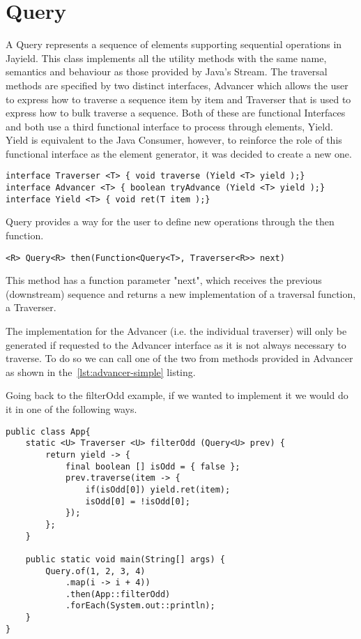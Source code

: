 \section{Query}

A Query represents a sequence of elements supporting sequential operations in Jayield. This class implements all the utility methods with the same name, semantics and behaviour as those provided by Java's Stream. The traversal methods are specified by two distinct interfaces, Advancer which allows the user to express how to traverse a sequence item by item and Traverser that is used to express how to bulk traverse a sequence. Both of these are functional Interfaces and both use a third functional interface to process through elements, Yield. Yield is equivalent to the Java Consumer, however, to reinforce the role of this functional interface as the element generator, it was decided to create a new one.
\begin{lstlisting}[caption={Interfaces},captionpos=b]
interface Traverser <T> { void traverse (Yield <T> yield );}
interface Advancer <T> { boolean tryAdvance (Yield <T> yield );}
interface Yield <T> { void ret(T item );}
\end{lstlisting}

Query provides a way for the user to define new operations through the then function.
\begin{lstlisting}[caption={Traversal function generator},captionpos=b]
<R> Query<R> then(Function<Query<T>, Traverser<R>> next)
\end{lstlisting}
This method has a function parameter "next", which receives the previous (downstream) sequence and returns a new implementation of a traversal function, a Traverser.


 The implementation for the Advancer (i.e. the individual traverser) will only be generated if requested to the Advancer interface as it is not always necessary to traverse. To do so we can call one of the two from methods provided in Advancer as shown in the~\ref{lst:advancer-simple} listing.

\newpage
Going back to the filterOdd example, if we wanted to implement it we would do it in one of the following ways.
\begin{lstlisting}[caption={filterOdd using Query and Traverser},captionpos=b]
public class App{
	static <U> Traverser <U> filterOdd (Query<U> prev) {
		return yield -> {
			final boolean [] isOdd = { false };
			prev.traverse(item -> {
				if(isOdd[0]) yield.ret(item);
				isOdd[0] = !isOdd[0];
			});
		};
	}

	public static void main(String[] args) {
		Query.of(1, 2, 3, 4)
            .map(i -> i + 4))
            .then(App::filterOdd)
            .forEach(System.out::println);
	}
}
\end{lstlisting}


